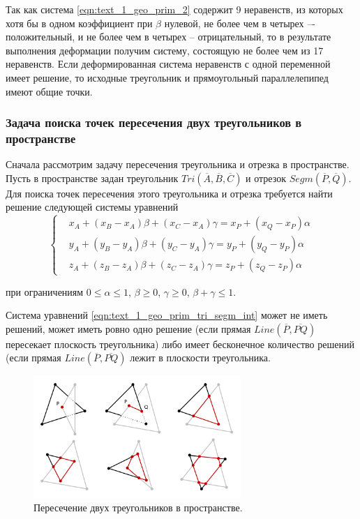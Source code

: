 Так как система \eqref{eqn:text_1_geo_prim_2} содержит 9 неравенств, из которых хотя бы в одном коэффициент при $\beta$ нулевой, не более чем в четырех –- положительный, и не более чем в четырех -- отрицательный, то в результате выполнения деформации получим систему, состоящую не более чем из 17 неравенств.
Если деформированная система неравенств с одной переменной имеет решение, то исходные треугольник и прямоугольный параллелепипед имеют общие точки.

\subsubsection{Задача поиска точек пересечения двух треугольников в пространстве}\label{sec:text_1_geo_prim_tri_tri}

Сначала рассмотрим задачу пересечения треугольника и отрезка в пространстве.
Пусть в пространстве задан треугольник $Tri(\overline{A}, \overline{B}, \overline{C})$ и отрезок $Segm(\overline{P}, \overline{Q})$.
Для поиска точек пересечения этого треугольника и отрезка требуется найти решение следующей системы уравнений
\begin{equation}\label{eqn:text_1_geo_prim_tri_segm_int}
	\left\{
		\begin{aligned}
			& x_A + (x_B - x_A) \beta + (x_C - x_A) \gamma = x_P + (x_Q - x_P) \alpha \\
			& y_A + (y_B - y_A) \beta + (y_C - y_A) \gamma = y_P + (y_Q - y_P) \alpha \\
			& z_A + (z_B - z_A) \beta + (z_C - z_A) \gamma = z_P + (z_Q - z_P) \alpha
		\end{aligned}
	\right.
\end{equation}

при ограничениям $0 \le \alpha \le 1$, $\beta \ge 0$, $\gamma \ge 0$, $\beta + \gamma \le 1$.

Система уравнений \eqref{eqn:text_1_geo_prim_tri_segm_int} может не иметь решений, может иметь ровно одно решение (если прямая $Line(\overline{P}, \overline{PQ})$ пересекает плоскость треугольника) либо имеет бесконечное количество решений (если прямая $Line(\overline{P}, \overline{PQ})$ лежит в плоскости треугольника.

\begin{figure}[ht]
	\centering
	\includegraphics[width=0.7\textwidth]{./pics/text_1_geo_prim/tri_tri.pdf}
	\caption{Пересечение двух треугольников в пространстве.}
	\label{fig:text_1_geo_prim_tri_tri}
\end{figure}

